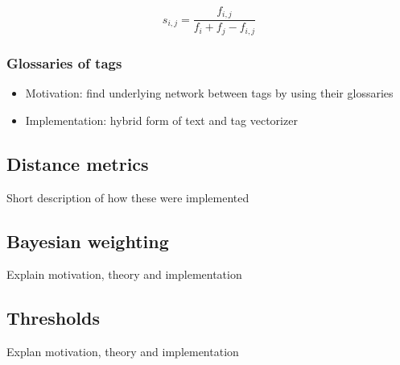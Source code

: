 \begin{equation} \label{eq:tag_similarity}
s_{i,j} = \frac{f_{i,j}}{f_i + f_j - f_{i,j}}
\end{equation}


\subsubsection{Glossaries of tags}
\begin{itemize}
\item Motivation: find underlying network between tags by using their glossaries
\item Implementation: hybrid form of text and tag vectorizer
\end{itemize}

\subsection{Distance metrics}
Short description of how these were implemented

\subsection{Bayesian weighting}
Explain motivation, theory and implementation 

\subsection{Thresholds}
Explan motivation, theory and implementation